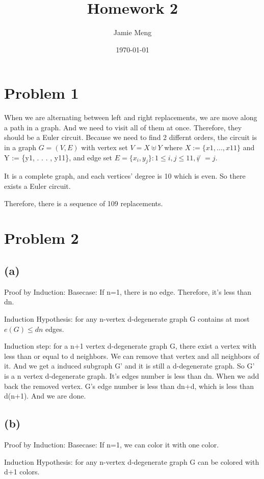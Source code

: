 \documentclass[11pt]{article}
\begin{document}
\title{Homework 2}
\author{Jamie Meng}
\date{\today}

\maketitle
\section{Problem 1}
When we are alternating between left and right replacements, we are move along a path in a graph. And we need to visit all of them at once. Therefore, they should be a Euler circuit. Because we need to find 2 differnt orders, the circuit is in a graph $ G = (V, E)$ with vertex set $V = X  \uplus Y$ where $X := \{ x1, . . . , x11\}$ and
Y := \{y1, . . . , y11\}, and edge set $ E = \{ x_i, y_j \} : 1 \le i, j \le 11, i̸ = j .$

It is a complete graph, and each vertices' degree is 10 which is even. So there exists a Euler circuit. 

Therefore, there is a sequence of 109 replacements.

\section{Problem 2}

\subsection*{(a)}
Proof by Induction:
Basecase: If n=1, there is no edge. Therefore, it's less than dn.

Induction Hypothesis: for any n-vertex d-degenerate graph G contains at most $e(G) \le dn$ edges.

Induction step: for a n+1 vertex d-degenerate graph G, there exist a vertex with less than or equal to d neighbors. We can remove that vertex and all neighbors of it. And we get a induced subgraph G' and it is still a d-degenerate graph. So G' is a n vertex d-degenerate graph. It's edges number is less than dn. When we add back the removed vertex. G's edge number is less than dn+d, which is less than d(n+1). And we are done.

\subsection*{(b)}
Proof by Induction:
Basecase: If n=1, we can color it with one color.

Induction Hypothesis: for any n-vertex d-degenerate graph G can be colored with d+1 colors.
\end{document}
